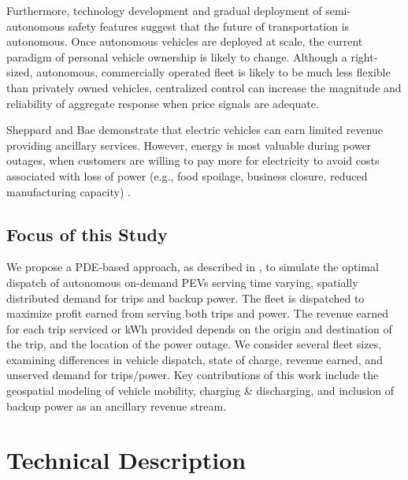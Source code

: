 \documentclass[journal]{IEEEtran}
\begin{document}
Furthermore, technology development and gradual deployment of semi-autonomous safety features suggest that the future of transportation is autonomous. Once autonomous vehicles are deployed at scale, the current paradigm of personal vehicle ownership is likely to change. Although a right-sized, autonomous, commercially operated fleet is likely to be much less flexible than privately owned vehicles, centralized control can increase the magnitude and reliability of aggregate response when price signals are adequate. 

Sheppard and Bae demonstrate that electric vehicles can earn limited revenue providing ancillary services. However, energy is most valuable during power outages, when customers are willing to pay more for electricity to avoid costs associated with loss of power (e.g., food spoilage, business closure, reduced manufacturing capacity) \cite{ice_calculator_2015}.

\subsection{Focus of this Study}

We propose a PDE-based approach, as described in \cite{lefloch_pde_2016}, to simulate the optimal dispatch of autonomous on-demand PEVs serving time varying, spatially distributed demand for trips and backup power. The fleet is dispatched to maximize profit earned from serving both trips and power. The revenue earned for each trip serviced or kWh provided depends on the origin and destination of the trip, and the location of the power outage. We consider several fleet sizes, examining differences in vehicle dispatch, state of charge, revenue earned, and unserved demand for trips/power. Key contributions of this work include the geospatial modeling of vehicle mobility, charging \& discharging, and inclusion of backup power as an ancillary revenue stream.

\section{Technical Description}
\end{document}
